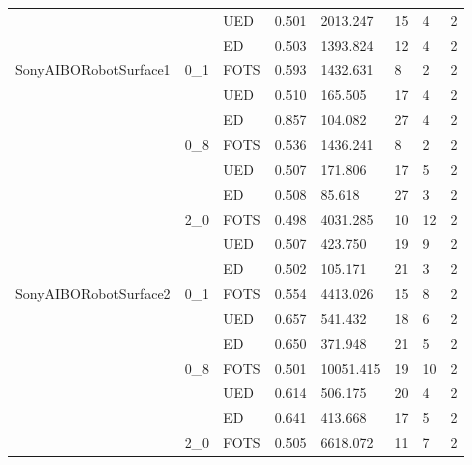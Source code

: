 \begin{tabular}{llllllll}
           &     & UED & 0.501 &  2013.247 &             15 &            4 &           2 \\
           &     & ED & 0.503 &  1393.824 &             12 &            4 &           2 \\
\cline{1-8}
\cline{2-8}
\multirow{9}{*}{SonyAIBORobotSurface1} & \multirow{3}{*}{0\_1} & FOTS & 0.593 &  1432.631 &              8 &            2 &           2 \\
           &     & UED & 0.510 &   165.505 &             17 &            4 &           2 \\
           &     & ED & 0.857 &   104.082 &             27 &            4 &           2 \\
\cline{2-8}
           & \multirow{3}{*}{0\_8} & FOTS & 0.536 &  1436.241 &              8 &            2 &           2 \\
           &     & UED & 0.507 &   171.806 &             17 &            5 &           2 \\
           &     & ED & 0.508 &    85.618 &             27 &            3 &           2 \\
\cline{2-8}
           & \multirow{3}{*}{2\_0} & FOTS & 0.498 &  4031.285 &             10 &           12 &           2 \\
           &     & UED & 0.507 &   423.750 &             19 &            9 &           2 \\
           &     & ED & 0.502 &   105.171 &             21 &            3 &           2 \\
\cline{1-8}
\cline{2-8}
\multirow{9}{*}{SonyAIBORobotSurface2} & \multirow{3}{*}{0\_1} & FOTS & 0.554 &  4413.026 &             15 &            8 &           2 \\
           &     & UED & 0.657 &   541.432 &             18 &            6 &           2 \\
           &     & ED & 0.650 &   371.948 &             21 &            5 &           2 \\
\cline{2-8}
           & \multirow{3}{*}{0\_8} & FOTS & 0.501 & 10051.415 &             19 &           10 &           2 \\
           &     & UED & 0.614 &   506.175 &             20 &            4 &           2 \\
           &     & ED & 0.641 &   413.668 &             17 &            5 &           2 \\
\cline{2-8}
           & \multirow{3}{*}{2\_0} & FOTS & 0.505 &  6618.072 &             11 &            7 &           2 \\

\end{tabular}

